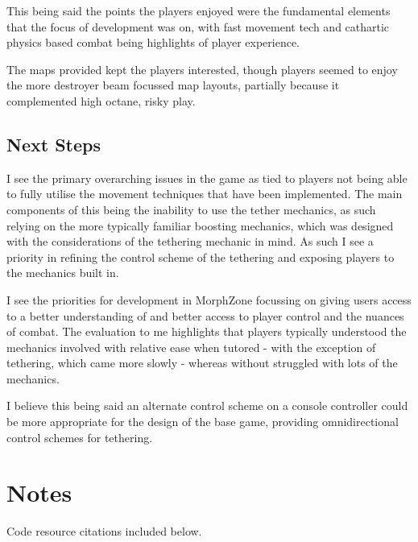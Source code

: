 \documentclass[10pt,a4paper]{article}
\begin{document}
This being said the points the players enjoyed were the fundamental elements that the focus of development was on, with fast movement tech and cathartic physics based combat being highlights of player experience.

The maps provided kept the players interested, though players seemed to enjoy the more destroyer beam focussed map layouts, partially because it complemented high octane, risky play.

\subsection{Next Steps}

I see the primary overarching issues in the game as tied to players not being able to fully utilise the movement techniques that have been implemented. The main components of this being the inability to use the tether mechanics, as such relying on the more typically familiar boosting mechanics, which was designed with the considerations of the tethering mechanic in mind. As such I see a priority in refining the control scheme of the tethering and exposing players to the mechanics built in.

I see the priorities for development in MorphZone focussing on giving users access to a better understanding of and better access to player control and the nuances of combat. The evaluation to me highlights that players typically understood the mechanics involved with relative ease when tutored - with the exception of tethering, which came more slowly - whereas without struggled with lots of the mechanics.

I believe this being said an alternate control scheme on a console controller could be more appropriate for the design of the base game, providing omnidirectional control schemes for tethering.

\section{Notes}

Code resource citations included below.
\end{document}
